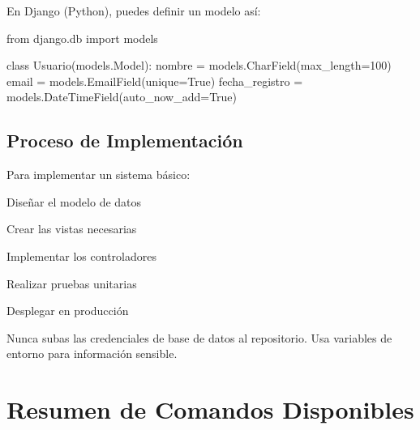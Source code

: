 \documentclass{template_pid}
\begin{document}
\begin{ejemplo}
En Django (Python), puedes definir un modelo así:

\begin{codigobloque}
from django.db import models

class Usuario(models.Model):
    nombre = models.CharField(max_length=100)
    email = models.EmailField(unique=True)
    fecha_registro = models.DateTimeField(auto_now_add=True)
\end{codigobloque}
\end{ejemplo}


\subsection{Proceso de Implementación}

Para implementar un sistema  básico:

\begin{enumeracion}
    \item Diseñar el modelo de datos
    \item Crear las vistas necesarias
    \item Implementar los controladores
    \item Realizar pruebas unitarias
    \item Desplegar en producción
\end{enumeracion}

\begin{advertencia}
Nunca subas las credenciales de base de datos al repositorio.
Usa variables de entorno para información sensible.
\end{advertencia}

\section{Resumen de Comandos Disponibles}
\end{document}
